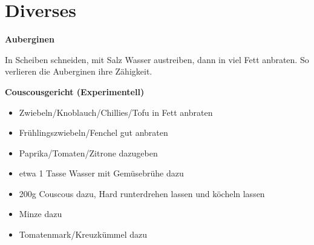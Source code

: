 \section{Diverses}

\textbf{Auberginen}

In Scheiben schneiden, mit Salz Wasser austreiben, dann in
viel Fett anbraten. So verlieren die Auberginen ihre Zähigkeit.

\vspace{2cm}

\textbf{Couscousgericht (Experimentell)}

\begin{itemize}
    \item Zwiebeln/Knoblauch/Chillies/Tofu in Fett anbraten
    \item Frühlingszwiebeln/Fenchel gut anbraten
    \item Paprika/Tomaten/Zitrone dazugeben
    \item etwa 1 Tasse Wasser mit Gemüsebrühe dazu
    \item 200g Couscous dazu, Hard runterdrehen lassen und köcheln lassen
    \item Minze dazu
    \item Tomatenmark/Kreuzkümmel dazu
\end{itemize}


\newpage
